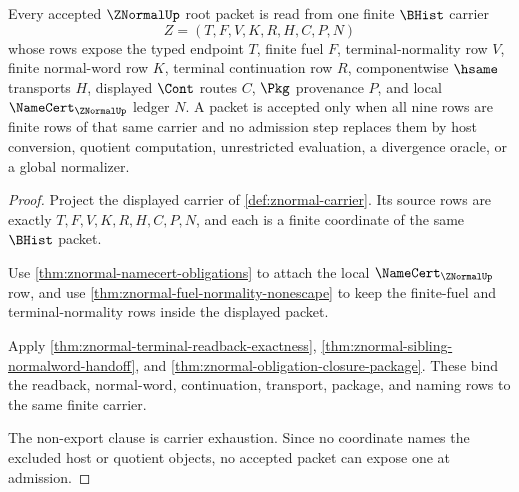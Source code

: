 \begin{theorem}
\label{thm:znormal-finite-fuel-carrier-admission}
Every accepted $\ZNormalUp$ root packet is read from one finite $\BHist$ carrier
$$
Z=(T,F,V,K,R,H,C,P,N)
$$
whose rows expose the typed endpoint $T$, finite fuel $F$, terminal-normality row $V$, finite normal-word row $K$, terminal continuation row $R$, componentwise $\hsame$ transports $H$, displayed $\Cont$ routes $C$, $\Pkg$ provenance $P$, and local $\NameCert_{\ZNormalUp}$ ledger $N$. A packet is accepted only when all nine rows are finite rows of that same carrier and no admission step replaces them by host conversion, quotient computation, unrestricted evaluation, a divergence oracle, or a global normalizer.
\end{theorem}
\begin{proof}
Project the displayed carrier of \autoref{def:znormal-carrier}. Its source rows are exactly $T,F,V,K,R,H,C,P,N$, and each is a finite coordinate of the same $\BHist$ packet.

Use \autoref{thm:znormal-namecert-obligations} to attach the local $\NameCert_{\ZNormalUp}$ row, and use \autoref{thm:znormal-fuel-normality-nonescape} to keep the finite-fuel and terminal-normality rows inside the displayed packet.

Apply \autoref{thm:znormal-terminal-readback-exactness}, \autoref{thm:znormal-sibling-normalword-handoff}, and \autoref{thm:znormal-obligation-closure-package}. These bind the readback, normal-word, continuation, transport, package, and naming rows to the same finite carrier.

The non-export clause is carrier exhaustion. Since no coordinate names the excluded host or quotient objects, no accepted packet can expose one at admission.
\end{proof}

